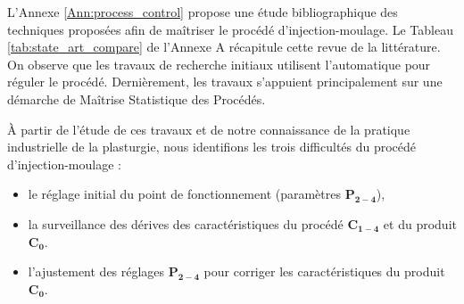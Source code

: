 
\noindent
L'Annexe \ref{Ann:process_control} propose une étude bibliographique des techniques proposées afin de maîtriser le procédé d'injection-moulage.
Le Tableau \ref{tab:state_art_compare} de l'Annexe A récapitule cette revue de la littérature.
On observe que les travaux de recherche initiaux utilisent l'automatique pour réguler le procédé.
Dernièrement, les travaux s'appuient principalement sur une démarche de Maîtrise Statistique des Procédés.  %

À partir de l'étude de ces travaux et de notre connaissance de la pratique industrielle de la plasturgie, nous identifions les trois difficultés du procédé d'injection-moulage :
\begin{itemize}
	\item le réglage initial du point de fonctionnement (paramètres $\boldsymbol{P_{2-4}}$),
	\item la surveillance des dérives des caractéristiques du procédé $\boldsymbol{C_{1-4}}$ et du produit $\boldsymbol{C_{0}}$.
	\item l'ajustement des réglages $\boldsymbol{P_{2-4}}$ pour corriger les caractéristiques du produit $\boldsymbol{C_{0}}$.
\end{itemize}

